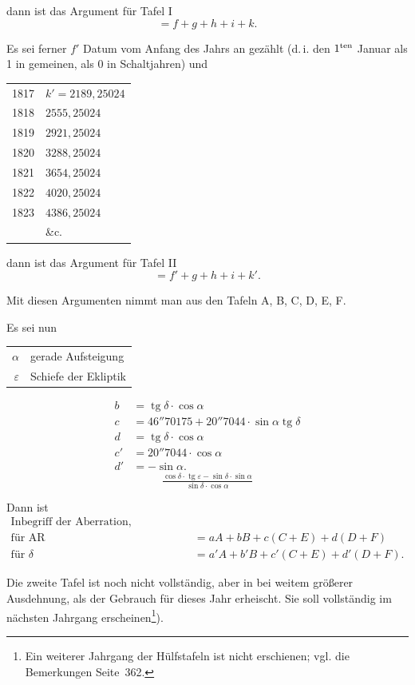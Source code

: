 \documentclass[12pt,a4paper]{article}
\theoremstyle{plain}
\theoremstyle{definition}
\theoremstyle{remark}
\DeclareMathOperator{\tg}{tg}
\begin{document}
dann ist das Argument f\"ur Tafel I
\[
= f + g + h + i + k.
\]

Es sei ferner $f'$ Datum vom Anfang des Jahrs an gez\"ahlt (d.\,i. den $1^{\rm ten}$ Januar als 1 in gemeinen, als 0 in Schaltjahren) und
\begin{center}
\begin{tabular}{r@{\quad}l}
1817 & $k' = 2189{,}25024$ \\
1818 & $2555{,}25024$ \\
1819 & $2921{,}25024$ \\
1820 & $3288{,}25024$ \\
1821 & $3654{,}25024$ \\
1822 & $4020{,}25024$ \\
1823 & $4386{,}25024$ \\
& \&c.
\end{tabular}
\end{center}

dann ist das Argument f\"ur Tafel II
\[
= f' + g + h + i + k'.
\]

Mit diesen Argumenten nimmt man aus den Tafeln A, B, C, D, E, F.

Es sei nun
\begin{center}
\begin{tabular}{r@{\ $=$\ }l}
$\alpha$ & gerade Aufsteigung \\
$\varepsilon$ & Schiefe der Ekliptik
\end{tabular}
\end{center}
\begin{align*}
b &= \tg\delta \cdot \cos\alpha \\
c &= 46''70175 + 20''7044 \cdot \sin\alpha \tg\delta \\
d &= \tg\delta \cdot \cos\alpha \\
c' &= 20''7044 \cdot \cos\alpha \\
d' &= -\sin\alpha.
\end{align*}
\[
\tfrac{\cos\delta \cdot \tg\varepsilon - \sin\delta \cdot \sin\alpha}{\sin\delta \cdot \cos\alpha}
\]

Dann ist
\begin{align*}
\text{Inbegriff der Aberration, Pr\"acession, Lunar- und Solar-Nutation}\\
\text{f\"ur AR} &= aA + bB + c(C+E) + d(D+F) \\
\text{f\"ur } \delta &= a'A + b'B + c'(C+E) + d'(D+F).
\end{align*}

Die zweite Tafel ist noch nicht vollst\"andig, aber in bei weitem gr\"o\ss erer Ausdehnung, als der Gebrauch f\"ur dieses Jahr erheischt. Sie soll vollst\"andig im n\"achsten Jahrgang erscheinen\footnote{Ein weiterer Jahrgang der H\"ulfstafeln ist nicht erschienen; vgl. die Bemerkungen Seite~362.}).
\end{document}
